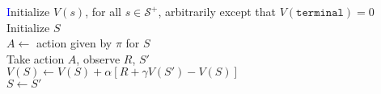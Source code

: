 \documentclass{standalone}
\begin{document}
\pagestyle{empty}
\begin{algorithm}[H]
  \KwInput{The policy $\pi$ to be evaluated; step size $\alpha \in (0, 1]$}
  \textcolor{blue}Initialize $V(s)$, for all $s \in \mathcal S^+$, arbitrarily except that   $V(\texttt{terminal}) = 0$ \\
 {
  Initialize $S$ \\
   {
    $A \gets $ action given by $\pi$ for $S$ \\
    Take action $A$, observe $R$, $S'$ \\
    $V(S) \gets V(S) + \alpha \left[ R + \gamma V(S') - V(S) \right]$ \\
    $S \gets S'$
  }
}
\end{algorithm}
\end{document}
